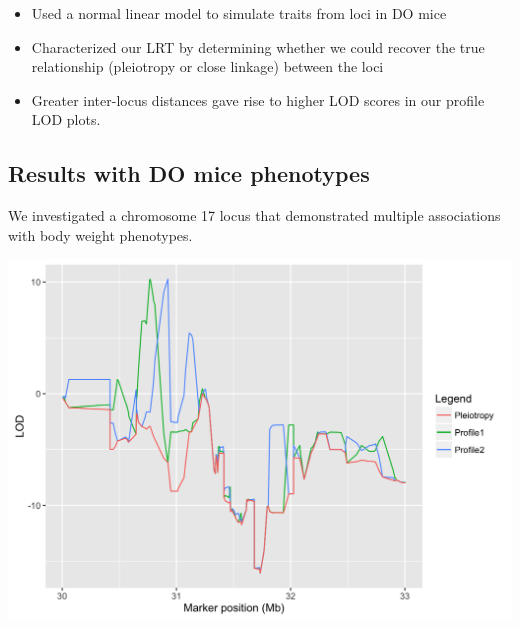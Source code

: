 \documentclass[a0,landscape]{a0poster}
\begin{document}
\begin{multicols}{4}
\begin{itemize}
\item Used a normal linear model to simulate traits from loci in DO mice
\item Characterized our LRT by determining whether we could recover the true relationship (pleiotropy or close linkage) between the loci
\item Greater inter-locus distances gave rise to higher LOD scores in our profile LOD plots.
\end{itemize}


\subsection*{Results with DO mice phenotypes}

We investigated a chromosome 17 locus that demonstrated multiple associations with body weight phenotypes. 

\begin{center}\vspace{1cm}
\includegraphics[width=0.8\linewidth]{do2.png}
\end{center}\vspace{1cm}


\end{multicols}
\end{document}
